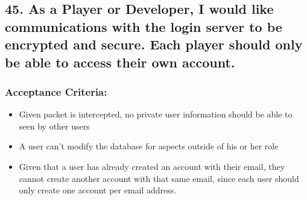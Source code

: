 \subsection*{45. As a Player or Developer, I would like communications with the login server to be encrypted and secure. Each player should only be able to access their own account. 
}


\subsubsection*{Acceptance Criteria:}

\begin{itemize}
\item Given packet is intercepted, no private user information should be able to seen by other users
\item A user can't modify the database for aspects outside of his or her role
\item Given that a user has already created an account with their email, they cannot create another account with that same email, since each user should only create one account per email address.
\end{itemize}
